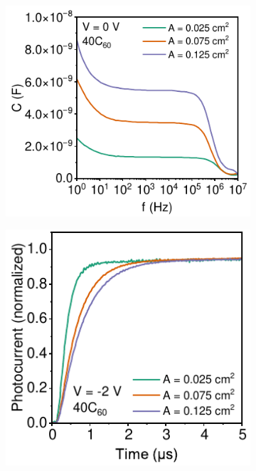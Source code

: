 \begin{figure}[htbp]
    \centering
    \begin{subfigure}{0.35\textwidth}
        \centering
        \includegraphics[width=\textwidth]{chapters/transport_layers/images/Capacitance_f_area.pdf}
        \caption{}
        \label{}
    \end{subfigure}
    \hfill
    \begin{subfigure}{0.3\textwidth}
        \centering
        \includegraphics[width=\textwidth]{chapters/transport_layers/images/TPC_f_area.pdf}

\end{subfigure}
\end{figure}
